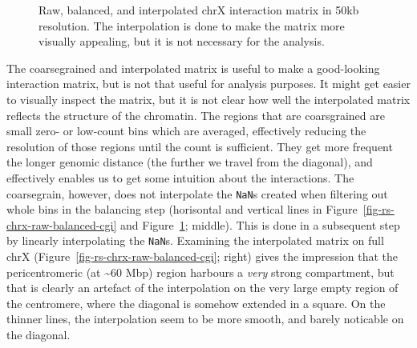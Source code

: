 \documentclass[
  11pt,
  a4paper,
]{scrbook}
\let\oldemph\emph
\renewcommand\emph[1]{\oldemph{\color{gray}#1}}
\begin{document}
\begin{figure}[H]


\caption{\label{fig-rs-chrx-raw-balanced-cgi-subset}Raw, balanced, and
interpolated chrX interaction matrix in 50kb resolution. The
interpolation is done to make the matrix more visually appealing, but it
is not necessary for the analysis.}

\end{figure}%

The coarsegrained and interpolated matrix is useful to make a
good-looking interaction matrix, but is not that useful for analysis
purposes. It might get easier to visually inspect the matrix, but it is
not clear how well the interpolated matrix reflects the structure of the
chromatin. The regions that are coarsgrained are small zero- or
low-count bins which are averaged, effectively reducing the resolution
of those regions until the count is sufficient. They get more frequent
the longer genomic distance (the further we travel from the diagonal),
and effectively enables us to get some intuition about the interactions.
The coarsegrain, however, does not interpolate the \texttt{NaN}s created
when filtering out whole bins in the balancing step (horisontal and
vertical lines in Figure~\ref{fig-rs-chrx-raw-balanced-cgi} and
Figure~\ref{fig-rs-chrx-raw-balanced-cgi-subset}; middle). This is done
in a subsequent step by linearly interpolating the \texttt{NaN}s.
Examining the interpolated matrix on full chrX
(Figure~\ref{fig-rs-chrx-raw-balanced-cgi}; right) gives the impression
that the pericentromeric (at \textasciitilde60 Mbp) region harbours a
\emph{very} strong compartment, but that is clearly an artefact of the
interpolation on the very large empty region of the centromere, where
the diagonal is somehow extended in a square. On the thinner lines, the
interpolation seem to be more smooth, and barely noticable on the
diagonal.
\end{document}
